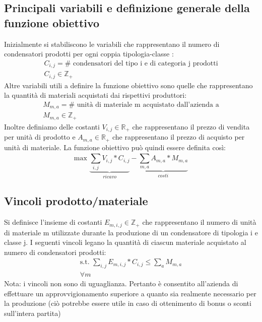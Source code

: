 \documentclass[11pt,a4paper]{article}
\begin{document}
\subsection{Principali variabili e definizione generale della funzione obiettivo}
Inizialmente si stabiliscono le variabili che rappresentano il numero di condensatori prodotti per ogni coppia tipologia-classe : \\
\begin{gather*}
C_{i,j}=\# \text{ condensatori del tipo i e di categoria j prodotti} \\
C_{i,j} \in \mathbb{Z}_+
\end{gather*}
Altre variabili utili a definire la funzione obiettivo sono quelle che rappresentano la quantità di materiali acquistati dai rispettivi produttori: \\
\begin{gather*}
M_{m,a}=\# \text{ unità di materiale m acquistato dall'azienda a} \\
M_{m,a} \in \mathbb{Z}_+
\end{gather*}
Inoltre definiamo delle costanti $V_{i,j} \in \mathbb{R}_+$ che rappresentano il prezzo di vendita per unità di prodotto e $A_{m,a} \in \mathbb{R}_+$ che rappresentano il prezzo di acquisto per unità di materiale.
La funzione obiettivo può quindi essere definita così: \\
\begin{equation}
\text{max } \underbrace{\sum_{i,j}^{} V_{i,j}*C_{i,j}}_{ricavo} - \underbrace{\sum_{m,a} A_{m,a}*M_{m,a}}_{costi}
\end{equation}
\subsection{Vincoli prodotto/materiale}
Si definisce l'insieme di costanti $E_{m,i,j} \in \mathbb{Z}_+$ che rappresentano il numero di unità di materiale m utilizzate durante la produzione di un condensatore di tipologia i e classe j.
I seguenti vincoli legano la quantità di ciascun materiale acquistato al numero di condensatori prodotti: \\
\begin{gather*}
\text{s.t. } \sum_{i,j} E_{m,i,j}*C_{i,j} \leq \sum_{a} M_{m,a} \\
\forall m
\end{gather*}
Nota: i vincoli non sono di uguaglianza. Pertanto è consentito all'azienda di effettuare un approvvigionamento superiore a quanto sia realmente necessario per la produzione (ciò potrebbe essere utile in caso di ottenimento di bonus o sconti sull'intera partita)
\end{document}
